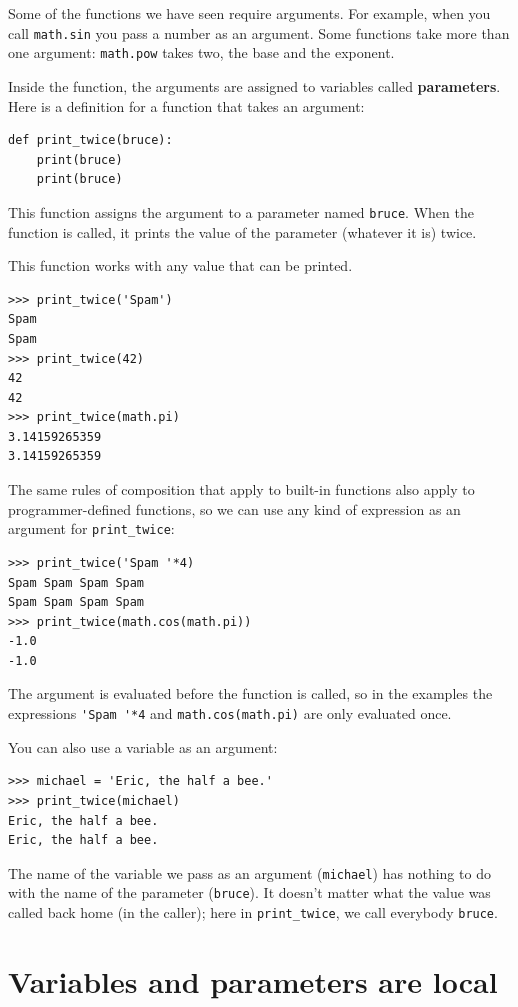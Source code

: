 Some of the functions we have seen require arguments.  For
example, when you call {\tt math.sin} you pass a number
as an argument.  Some functions take more than one argument:
{\tt math.pow} takes two, the base and the exponent.

Inside the function, the arguments are assigned to
variables called {\bf parameters}.  Here is a definition for
a function that takes an argument:

\begin{lstlisting}
def print_twice(bruce):
    print(bruce)
    print(bruce)
\end{lstlisting}
%
This function assigns the argument to a parameter
named {\tt bruce}.  When the function is called, it prints the value of
the parameter (whatever it is) twice.

This function works with any value that can be printed.

\begin{lstlisting}
>>> print_twice('Spam')
Spam
Spam
>>> print_twice(42)
42
42
>>> print_twice(math.pi)
3.14159265359
3.14159265359
\end{lstlisting}
%
The same rules of composition that apply to built-in functions also
apply to programmer-defined functions, so we can use any kind of expression
as an argument for \verb"print_twice":

\begin{lstlisting}
>>> print_twice('Spam '*4)
Spam Spam Spam Spam
Spam Spam Spam Spam
>>> print_twice(math.cos(math.pi))
-1.0
-1.0
\end{lstlisting}
%
The argument is evaluated before the function is called, so
in the examples the expressions \verb"'Spam '*4" and
{\tt math.cos(math.pi)} are only evaluated once.

You can also use a variable as an argument:

\begin{lstlisting}
>>> michael = 'Eric, the half a bee.'
>>> print_twice(michael)
Eric, the half a bee.
Eric, the half a bee.
\end{lstlisting}
%
The name of the variable we pass as an argument ({\tt michael}) has
nothing to do with the name of the parameter ({\tt bruce}).  It
doesn't matter what the value was called back home (in the caller);
here in \verb"print_twice", we call everybody {\tt bruce}.


%
\section{Variables and parameters are local}

